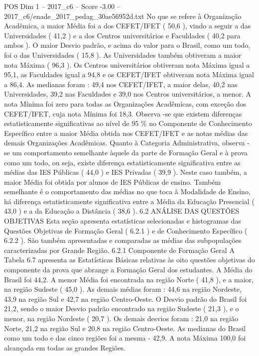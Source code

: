 \begin{textsample}{POS Dim 1 – 2017\_c6 – Score -3.00 – 2017\_c6/enade\_2017\_pedag\_30ae56952d.txt}
No que se refere à Organização Acadêmica, a maior Média foi a dos CEFET/IFET ( 50,6 ), vindo a seguir a das Universidades ( 41,2 ) e a dos Centros universitários e Faculdades ( 40,2 para ambos ).
O maior Desvio padrão, e acima do valor para o Brasil, como um todo, foi o das Universidades ( 15,8 ).
As Universidades também obtiveram a maior nota Máxima ( 96,3 ).
Os Centros universitários obtiveram nota Máxima igual a 95,1, as Faculdades igual a 94,8 e os CEFET/IFET obtiveram nota Máxima igual a 86,4.
As medianas foram : 49,4 nos CEFET/IFET, a maior delas, 40,2 nas Universidades, 39,2 nas Faculdades e 39,0 nos Centros universitários, a menor.
A nota Mínima foi zero para todas as Organizações Acadêmicas, com exceção dos CEFET/IFET, cuja nota Mínima foi 18,3.
Observa -se que existem diferenças estatisticamente significativas ao nível de 95 \% no Componente de Conhecimento Específico entre a maior Média obtida nos CEFET/IFET e as notas médias das demais Organizações Acadêmicas.
Quanto à Categoria Administrativa, observa -se um comportamento semelhante àquele da parte de Formação Geral e à prova como um todo, ou seja, existe diferença estatisticamente significativa entre as médias das IES Públicas ( 44,0 ) e IES Privadas ( 39,9 ).
Neste caso também, a maior Média foi obtida por alunos de IES Públicas de ensino.
Também semelhante é o comportamento das médias no que toca à Modalidade de Ensino, há diferença estatisticamente significativa entre a Média da Educação Presencial ( 43,0 ) e a da Educação a Distância ( 38,6 ). 6.2 ANÁLISE DAS QUESTÕES OBJETIVAS Esta seção apresenta estatísticas selecionadas e histogramas das Questões Objetivas de Formação Geral ( 6.2.1 ) e de Conhecimento Específico ( 6.2.2 ).
São também apresentadas e comparadas as médias das subpopulações caracterizadas por Grande Região. 6.2.1 Componente de Formação Geral A Tabela 6.7 apresenta as Estatísticas Básicas relativas às oito questões objetivas do componente da prova que abrange a Formação Geral dos estudantes.
A Média do Brasil foi 44,2.
A menor Média foi encontrada na região Norte ( 41,8 ), e a maior, na região Sudeste ( 45,0 ).
As demais médias foram : 44,6 na região Nordeste, 43,9 na região Sul e 42,7 na região Centro-Oeste.
O Desvio padrão do Brasil foi 21,2, sendo o maior Desvio padrão encontrado na região Sudeste ( 21,3 ), e o menor, na região Nordeste ( 20,7 ).
Os demais desvios foram : 21,0 na região Norte, 21,2 na região Sul e 20,8 na região Centro-Oeste.
As medianas do Brasil como um todo e das cinco regiões foi a mesma - 42,9.
A nota Máxima 100,0 foi alcançada em todas as grandes Regiões.

\end{textsample}
